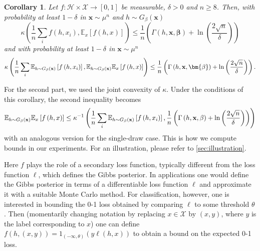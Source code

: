 \documentclass{article} %
\newtheorem{corollary}[theorem]{Corollary}
\begin{document}
\begin{corollary}
\label{Corollary kl}Let $f:\mathcal{H}\times\mathcal{X}\rightarrow [0,1]$ be measurable, $\delta>0$ and $n\geq 8$. Then, with probability
at least $1-\delta$ in $\mathbf{x}\sim \mu ^{n}$ and $h\sim G_{\beta
}(\mathbf{x})$
\begin{equation*}
\kappa \left(\frac{1}{n}\sum_{i}f(h,x_{i}),\mathbb{E}_{x}[f(h,x)]\right) \leq \frac{1}{n}\left(\Gamma(h,\mathbf{x},\bm{\beta})+\ln \left(\frac{2\sqrt{n}}{\delta}\right) \right)
\end{equation*}
and with probability at least $1-\delta $ in $\mathbf{x}\sim \mu ^{n}$%
\begin{equation*}
\kappa \left(\frac{1}{n}\sum_{i} \mathbb{E}_{h\sim G_{\beta }\left( \mathbf{%
x}\right) }\left[ f\left( h,x_{i}\right) \right] ,\mathbb{E}_{h\sim G_{\beta
}\left( \mathbf{x}\right) }\mathbb{E}_{x}\left[ f\left( h,x\right) \right]
\right) \leq \frac{1}{n}\left( \Gamma \left( h,\mathbf{x},\bm{\beta}%
\right) +\ln \left( \frac{2\sqrt{n}}{\delta }\right) \right) .
\end{equation*}
\end{corollary}

For the second part, we used the joint convexity of $\kappa $. Under the
conditions of this corollary, the second inequality becomes%
\begin{equation*}
\mathbb{E}_{h\sim G_{\beta }\left( \mathbf{x}\right) }\mathbb{E}_{x}\left[
f\left( h,x\right) \right] \leq \kappa ^{-1}\left( \frac{1}{n}\sum_{i}%
\mathbb{E}_{h\sim G_{\beta }\left( \mathbf{x}\right) }\left[ f\left(
h,x_{i}\right) \right] ,\frac{1}{n}\left( \Gamma \left( h,\mathbf{x},\mathbf{%
\beta }\right) +\ln \left( \frac{2\sqrt{n}}{\delta }\right) \right) \right)
\end{equation*}%
with an analogous version for the single-draw case. This is how we compute bounds in our experiments. For an illustration, please refer to \ref{sec:illustration}. 

Here $f$ plays the role of a secondary loss function, typically different from the loss function $\ell$, which defines the Gibbs posterior.
In applications one would define the Gibbs posterior in terms of a differentiable loss function $\ell $ and approximate it with a suitable Monte Carlo method. For classification, however, one is interested in bounding the 0-1 loss obtained by comparing $\ell $ to some threshold $\theta$. Then (momentarily changing notation by replacing $x\in \mathcal{X}$
by $\left( x,y\right) $, where $y$ is the label corresponding to $x$) one
can define $f\left( h,\left( x,y\right) \right) =1_{\left( -\infty ,\theta
\right) }\left( y\ell \left( h,x\right) \right) $ to obtain a bound on the
expected 0-1 loss. 
\end{document}
